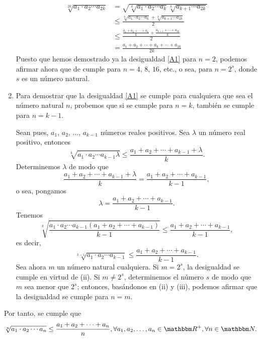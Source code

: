 \begin{example}
\begin{enumerate}[label=\roman*.]
        \begin{align*}
            \sqrt[2k]{a_1\cdot a_2 \cdots a_{2k}} & = \sqrt{\sqrt[k]{a_1 \cdot a_2 \cdots a_k}\sqrt[k]{a_{k+1} \cdots a_{2k}}} \\
            & \leq \frac{\sqrt[k]{a_1 \cdot a_2 \cdots a_k} + \sqrt[k]{a_{k+1} \cdots a_{2k}}}{2} \\
            & \leq \displaystyle\frac{\displaystyle\frac{a_1+a_2+\cdots +a_k}{k} +\displaystyle\frac{a_{k+1}+\cdots+a_{2k}}{k}}{2} \\
            & = \frac{a_1+a_2+\cdots+a_k+\cdots+a_{2k}}{2k}
        \end{align*}
        Puesto que hemos demostrado ya la desigualdad \eqref{A1} para $n = 2$, podemos afirmar ahora que de cumple para $n = 4$, $8$, $16$, etc., o sea, para $n = 2^s$, donde $s$ es un número natural.
        \item Para demostrar que la desigualdad \eqref{A1} se cumple para cualquiera que sea el número natural $n$, probemos que si se cumple para $n = k$, también se cumple para $n = k-1$.
        
        Sean pues, $a_1$, $a_2$, $\dots$, $a_{k-1}$ números reales positivos. Sea $\lambda$ un número real positivo, entonces
        $$\sqrt[k]{a_1 \cdot a_2 \cdots a_{k-1}\lambda} \leq \frac{a_1+a_2+\cdots+a_{k-1}+\lambda}{k}.$$
        Determinemos $\lambda$ de modo que
        $$\frac{a_1+a_2+\cdots+a_{k-1}+\lambda}{k} = \frac{a_1+a_2+\cdots+a_{k-1}}{k-1},$$
        o sea, pongamos
        $$\lambda = \frac{a_1+a_2+\cdots+a_{k-1}}{k-1}.$$\newpage
        Tenemos
        $$\sqrt[k]{\frac{a_1 \cdot a_2 \cdots a_{k-1} (a_1+a_2+\cdots+a_{k-1})}{k-1}} \leq \frac{a_1+a_2+\cdots+a_{k-1}}{k-1},$$
        es decir,
        $$\sqrt[k-1]{a_1 \cdot a_2 \cdots a_{k-1}} \leq \frac{a_1+a_2+\cdots+a_{k-1}}{k-1}.$$
        Sea ahora $m$ un número natural cualquiera. Si $m = 2^s$, la desigualdad se cumple en virtud de (ii). Si $m \neq 2^s$, determinemos el número $s$ de modo que $m$ sea menor que $2^s$; entonces, basándonos en (ii) y (iii), podemos afirmar que la desigualdad se cumple para $n = m$.
    \end{enumerate}
    Por tanto, se cumple que
    $$\sqrt[n]{a_1\cdot a_2 \cdots a_n} \leq \frac{a_1+a_2+\cdots +a_n}{n}, \forall a_1, a_2, \dots, a_n \in \RR[+], \forall n \in \NN.$$
\end{example}

